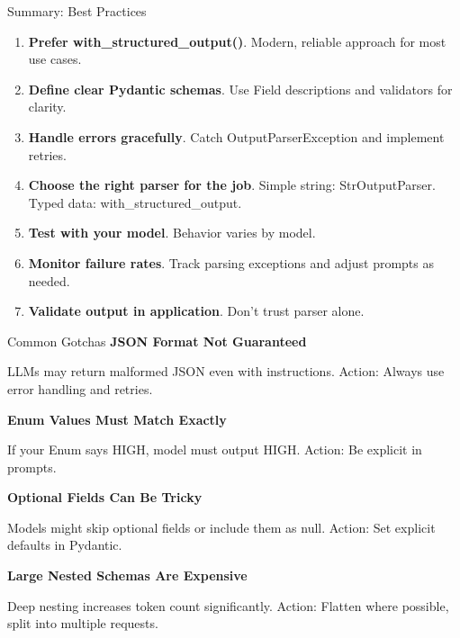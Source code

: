 \documentclass[aspectratio=169,11pt]{beamer}
\begin{document}
\begin{frame}{Summary: Best Practices}
\begin{enumerate}
  \item \textbf{Prefer with\_structured\_output()}. Modern, reliable approach for most use cases.

  \item \textbf{Define clear Pydantic schemas}. Use Field descriptions and validators for clarity.

  \item \textbf{Handle errors gracefully}. Catch OutputParserException and implement retries.

  \item \textbf{Choose the right parser for the job}. Simple string: StrOutputParser. Typed data: with\_structured\_output.

  \item \textbf{Test with your model}. Behavior varies by model.

  \item \textbf{Monitor failure rates}. Track parsing exceptions and adjust prompts as needed.

  \item \textbf{Validate output in application}. Don't trust parser alone.
\end{enumerate}
\end{frame}

\begin{frame}{Common Gotchas}
\textbf{JSON Format Not Guaranteed}

LLMs may return malformed JSON even with instructions. Action: Always use error handling and retries.

\vspace{0.08cm}

\textbf{Enum Values Must Match Exactly}

If your Enum says HIGH, model must output HIGH. Action: Be explicit in prompts.

\vspace{0.08cm}

\textbf{Optional Fields Can Be Tricky}

Models might skip optional fields or include them as null. Action: Set explicit defaults in Pydantic.

\vspace{0.08cm}

\textbf{Large Nested Schemas Are Expensive}

Deep nesting increases token count significantly. Action: Flatten where possible, split into multiple requests.
\end{frame}
\end{document}
